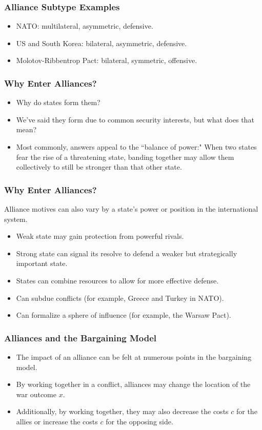 \documentclass[handout]{beamer}
\begin{document}
\begin{frame} 
	\frametitle{\LARGE{Alliance Subtype Examples}}
	\begin{itemize}
		\item NATO: multilateral, asymmetric, defensive. \pause
		\item US and South Korea: bilateral, asymmetric, defensive. \pause
		\item Molotov-Ribbentrop Pact: bilateral, symmetric, offensive.
	\end{itemize}
\end{frame}

\begin{frame} 
\frametitle{\LARGE{Why Enter Alliances?}}
	\begin{itemize}
		\item Why do states form them? 
		\item We've said they form due to common security interests, but what does that mean? \pause 
		\item Most commonly, answers appeal to the ``balance of power:" When two states fear the rise of a threatening state, banding together may allow them collectively to still be stronger than that other state.
	\end{itemize}
\end{frame}

\begin{frame} 
	\frametitle{\LARGE{Why Enter Alliances?}}
Alliance motives can also vary by a state's power or position in the international system.
	\begin{itemize}
		\item Weak state may gain protection from powerful rivals. \pause
		\item Strong state can signal its resolve to defend a weaker but strategically important state. \pause
		\item States can combine resources to allow for more effective defense. \pause
		\item Can subdue conflicts (for example, Greece and Turkey in NATO). \pause
		\item Can formalize a sphere of influence (for example, the Warsaw Pact). 		
	\end{itemize}
\end{frame}

\begin{frame} 
	\frametitle{\LARGE{Alliances and the Bargaining Model}}
	\begin{itemize}
		\item The impact of an alliance can be felt at numerous points in the bargaining model. \pause
		\item By working together in a conflict, alliances may change the location of the war outcome $x$. \pause
		\item Additionally, by working together, they may also decrease the costs $c$ for the allies or increase the costs $c$ for the opposing side.		
	\end{itemize}
\end{frame}
\end{document}
